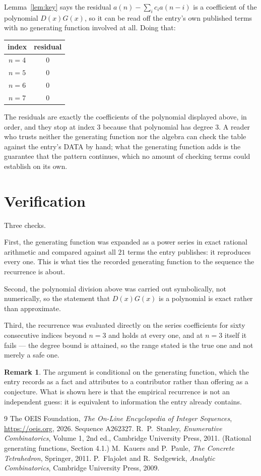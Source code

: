 \documentclass[11pt,a4paper]{article}
\theoremstyle{plain}
\theoremstyle{definition}
\newtheorem{remark}[theorem]{Remark}
\begin{document}
Lemma~\ref{lem:key} says the residual $a(n)-\sum_ic_ia(n-i)$ is a coefficient of the
polynomial $D(x)G(x)$, so it can be read off the entry's own published terms with no
generating function involved at all. Doing that:
\begin{center}
\begin{tabular}{cc}
index & residual \\ \hline
$n=4$ & $0$ \\
$n=5$ & $0$ \\
$n=6$ & $0$ \\
$n=7$ & $0$
\end{tabular}
\end{center}
The residuals are exactly the coefficients of the polynomial displayed above, in order, and
they stop at index $3$ because that polynomial has degree $3$. A reader who trusts
neither the generating function nor the algebra can check the table against the entry's DATA
by hand; what the generating function adds is the guarantee that the pattern continues, which
no amount of checking terms could establish on its own.

\section{Verification}

Three checks.

First, the generating function was expanded as a power series in exact rational arithmetic and
compared against all $21$ terms the entry publishes: it reproduces every one. This is
what ties the recorded generating function to the sequence the recurrence is about.

Second, the polynomial division above was carried out symbolically, not numerically, so the
statement that $D(x)G(x)$ is a polynomial is exact rather than approximate.

Third, the recurrence was evaluated directly on the series coefficients for sixty consecutive
indices beyond $n=3$ and holds at every one, and at $n=3$ itself it fails --- the
degree bound is attained, so the range stated is the true one and not merely a safe one.

\begin{remark}
The argument is conditional on the generating function, which the entry records as a fact and
attributes to a contributor rather than offering as a conjecture. What is shown here is that
the empirical recurrence is not an independent guess: it is equivalent to information the
entry already contains.
\end{remark}

\begin{thebibliography}{9}
 The OEIS Foundation, \emph{The On-Line Encyclopedia of Integer
Sequences}, \url{https://oeis.org}, 2026. Sequence A262327.
 R.~P.~Stanley, \emph{Enumerative Combinatorics}, Volume 1, 2nd ed.,
Cambridge University Press, 2011. (Rational generating functions, Section 4.1.)
 M.~Kauers and P.~Paule, \emph{The Concrete Tetrahedron}, Springer, 2011.
 P.~Flajolet and R.~Sedgewick, \emph{Analytic Combinatorics}, Cambridge
University Press, 2009.
\end{thebibliography}
\end{document}
